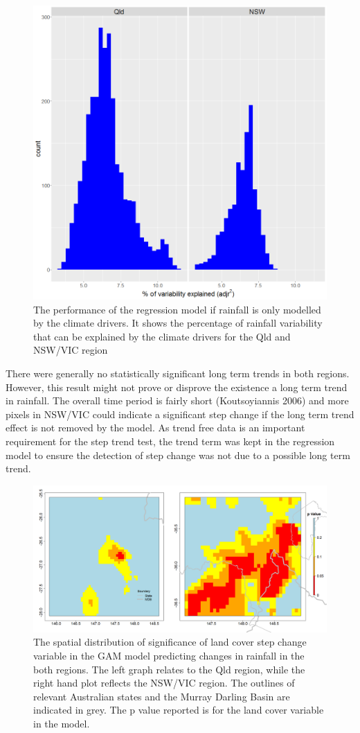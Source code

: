 \documentclass[fleqn,10pt,lineno]{wlpeerj} %
\begin{document}
\begin{figure}
\includegraphics[width=0.7\linewidth,height=0.7\textheight]{figures/soi_explhistogram} \caption{The performance of the regression model if rainfall is only modelled by the climate drivers. It shows the percentage of rainfall variability that can be explained by the climate drivers for the Qld and NSW/VIC region}\label{fig:rsq}
\end{figure}

There were generally no statistically significant long term trends in
both regions. However, this result might not prove or disprove the
existence a long term trend in rainfall. The overall time period is
fairly short (Koutsoyiannis 2006) and more pixels in NSW/VIC could
indicate a significant step change if the long term trend effect is not
removed by the model. As trend free data is an important requirement for
the step trend test, the trend term was kept in the regression model to
ensure the detection of step change was not due to a possible long term
trend.

\begin{figure}
\includegraphics[width=0.9\linewidth]{figures/Cp_30yrs} \caption{The spatial distribution of significance of land cover step change variable in the GAM model predicting changes in rainfall in the both regions. The left graph relates to the Qld region, while the right hand plot reflects the NSW/VIC region. The outlines of relevant Australian states and the Murray Darling Basin are indicated in grey.  The p value reported is for the land cover variable in the model.}\label{fig:LCp}
\end{figure}
\end{document}
